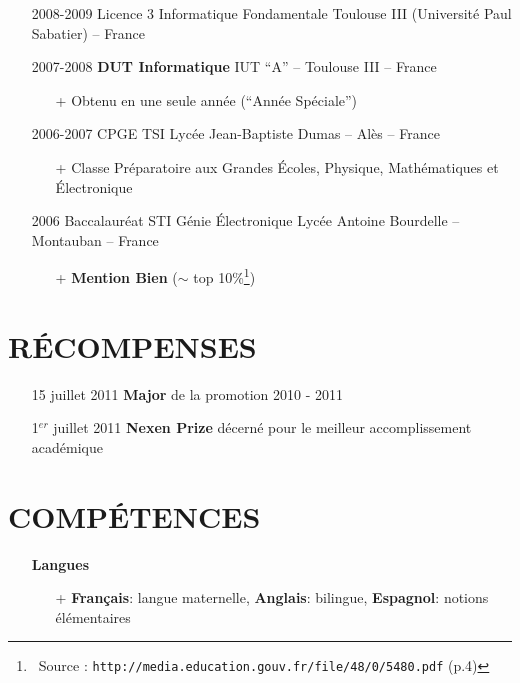 \documentclass{res}
\begin{document}
\begin{resume}
\begin{itemize}
\item[] 2008-2009 \tabto{2cm} Licence 3 Informatique Fondamentale \hfill Toulouse III (Universit\'e Paul Sabatier) -- France

\item[] 2007-2008 \tabto{2cm} \textbf{DUT Informatique} \hfill IUT ``A'' -- Toulouse III -- France
	\begin{itemize}
		\item[+] Obtenu en une seule ann\'ee (``Ann\'ee Sp\'eciale'')
	\end{itemize}

\item[] 2006-2007 \tabto{2cm} CPGE TSI \hfill Lyc\'ee Jean-Baptiste Dumas -- Al\`es -- France
	\begin{itemize}
		\item[+] Classe Pr\'eparatoire aux Grandes \'Ecoles, Physique, Math\'ematiques et \'Electronique
	\end{itemize}
	
\item[] 2006 \tabto{2cm} Baccalaur\'eat STI G\'enie \'Electronique \hfill Lyc\'ee Antoine Bourdelle -- Montauban -- France
	\begin{itemize}
		\item[+] \textbf{Mention Bien} ($\sim$ top 10\%\footnote{~Source : \texttt{http://media.education.gouv.fr/file/48/0/5480.pdf} (p.4)})
	\end{itemize}
\end{itemize}

\section{R\'ECOMPENSES}
\begin{itemize}
	\item[] 15 juillet 2011 \tabto{4cm} \textbf{Major} de la promotion 2010 - 2011
	\item[] 1$^{er}$ juillet 2011 \tabto{4cm} \textbf{Nexen Prize} d\'ecern\'e pour le meilleur accomplissement acad\'emique
\end{itemize}


\section{COMP\'ETENCES} 
	\begin{itemize}
		\item[] \textbf{Langues}
		\begin{itemize}
                 \item[+]  \textbf{Fran\c{c}ais}: langue maternelle, \textbf{Anglais}: bilingue, \textbf{Espagnol}: notions \'el\'ementaires
		\end{itemize}	
	\end{itemize}
	

\end{resume}
\end{document}
